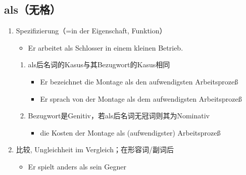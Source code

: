\documentclass[UTF8]{report}
\begin{document}
\subsection{als（无格）}
\begin{enumerate}
    \item Spezifizierung（=in der Eigenschaft, Funktion）
    \begin{itemize}
        \item Er arbeitet als Schlosser in einem kleinen Betrieb.
    \end{itemize}
    \begin{enumerate}
        \item als后名词的Kasus与其Bezugwort的Kasus相同
        \begin{itemize}
            \item Er bezeichnet die Montage als den aufwendigsten Arbeitsprozeß
            \item Er sprach von der Montage als dem aufwendigsten Arbeitsprozeß
        \end{itemize}
        \item Bezugwort是Genitiv，若als后名词无冠词则其为Nominativ
        \begin{itemize}
            \item die Kosten der Montage als (aufwendigster) Arbeitsprozeß
        \end{itemize}
    \end{enumerate}
    \item 比较, Ungleichheit im Vergleich；在形容词/副词后
    \begin{itemize}
        \item Er spielt anders als sein Gegner
    \end{itemize}
\end{enumerate}
\end{document}
